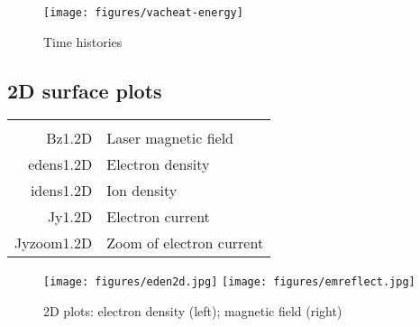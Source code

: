 \documentclass[11pt]{article}
\begin{document}
\begin{figure}[ht]
\begin{center}
\texttt{[image: figures/vacheat-energy]}
\caption{Time histories}
\end{center}
\end{figure}

\subsection{2D surface plots} 
\begin{tabular}{rl}
\hline\\ 

 Bz1.2D& Laser magnetic field \\
 edens1.2D& Electron density \\
 idens1.2D& Ion density \\
 Jy1.2D& Electron current \\
 Jyzoom1.2D& Zoom of electron current\\
\end{tabular}
\begin{figure}[ht]
\begin{center}
\texttt{[image: figures/eden2d.jpg]} \hspace{1cm}
\texttt{[image: figures/emreflect.jpg]}
\caption{2D plots: electron density (left); magnetic field (right)}
\end{center}
\end{figure}
\end{document}
